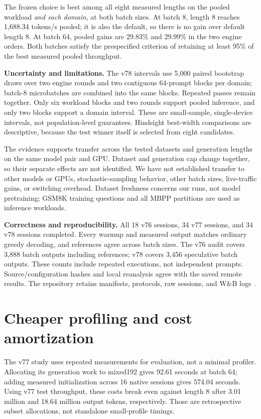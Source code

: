 \documentclass[10pt]{article}
\begin{document}
The frozen choice is best among all eight measured lengths on the pooled workload \emph{and each domain}, at both batch sizes. At batch 8, length 8 reaches 1,688.34 tokens/s pooled; it is also the default, so there is no gain over default length 8. At batch 64, pooled gains are 29.83\% and 29.99\% in the two engine orders. Both batches satisfy the prespecified criterion of retaining at least 95\% of the best measured pooled throughput.

\textbf{Uncertainty and limitations.} The v78 intervals use 5,000 paired bootstrap draws over two engine rounds and two contiguous 64-prompt blocks per domain; batch-8 microbatches are combined into the same blocks. Repeated passes remain together. Only six workload blocks and two rounds support pooled inference, and only two blocks support a domain interval. These are small-sample, single-device intervals, not population-level guarantees. Hindsight best-width comparisons are descriptive, because the test winner itself is selected from eight candidates.

The evidence supports transfer across the tested datasets and generation lengths on the same model pair and GPU. Dataset and generation cap change together, so their separate effects are not identified. We have not established transfer to other models or GPUs, stochastic-sampling behavior, other batch sizes, live-traffic gains, or switching overhead. Dataset freshness concerns our runs, not model pretraining; GSM8K training questions and all MBPP partitions are used as inference workloads.

\textbf{Correctness and reproducibility.} All 18 v76 sessions, 34 v77 sessions, and 34 v78 sessions completed. Every warmup and measured output matches ordinary greedy decoding, and references agree across batch sizes. The v76 audit covers 3,888 batch outputs including references; v78 covers 3,456 speculative batch outputs. These counts include repeated executions, not independent prompts. Source/configuration hashes and local reanalysis agree with the saved remote results. The repository retains manifests, protocols, raw sessions, and W\&B logs~\cite{artifact}.

\newpage
\section{Cheaper profiling and cost amortization}
The v77 study uses repeated measurements for evaluation, not a minimal profiler. Allocating its generation work to mixed192 gives 92.61 seconds at batch 64; adding measured initialization across 16 native sessions gives 574.04 seconds. Using v77 test throughput, these costs break even against length 8 after 3.01 million and 18.64 million output tokens, respectively. Those are retrospective subset allocations, not standalone small-profile timings.
\end{document}
